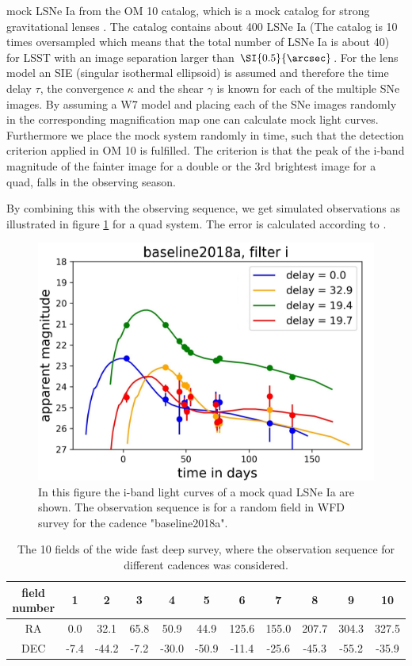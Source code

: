 mock LSNe Ia from the OM 10 catalog, which is a mock catalog for
strong gravitational lenses \citep{Oguri:2010}. The catalog contains
about 400 LSNe Ia (The catalog is 10 times oversampled which means
that the total number of LSNe Ia is about 40) for LSST with an image
separation larger than $\SI{0.5}{\arcsec}$. For the lens model an SIE
(singular isothermal ellipsoid) \citep{Kormann:1994} is assumed and
therefore the time delay $\tau$, the convergence $\kappa$ and the
shear $\gamma$ is known for each of the multiple SNe images. By
assuming a W7 model and placing each of the SNe images randomly in the
corresponding magnification map one can calculate mock light
curves. Furthermore we place the mock system randomly in time, such
that the detection criterion applied in OM 10 is fulfilled. The
criterion is that the peak of the i-band magnitude of the fainter image
for a double or the 3rd brightest image for a quad, falls in the
observing season.


By combining this with the observing sequence, we get simulated
observations as illustrated in figure \ref{fig: simulated observation}
for a quad system. The error is calculated according to \cite[sec 3.5,
p. 67]{2009:LSSTscience}.
\begin{figure}[h!]
\centering
\includegraphics[scale=0.7]{figures/Obsevation_number399_baseline2018a_filter_i_oversampling_00.jpg}
\caption[]{In this figure the i-band light curves of a mock quad LSNe Ia are shown. The observation sequence is for a random field in WFD survey for the cadence "baseline2018a".}
\label{fig: simulated observation}
\end{figure}
%
\begin{table}
\centering
\begin{tabular}{c|c|c|c|c|c|c|c|c|c|c}
field number & 1 & 2 & 3 & 4 & 5& 6 & 7 & 8 & 9 & 10  \\
\hline
RA& 0.0 & 32.1 & 65.8 & 50.9 &44.9& 125.6 & 155.0 & 207.7 & 304.3 & 327.5  \\
\hline
DEC& -7.4 & -44.2 & -7.2 & -30.0 & -50.9& -11.4 & -25.6 & -45.3 & -55.2 & -35.9  \\
\end{tabular}
\caption{The 10 fields of the wide fast deep survey, where the observation sequence for different cadences was considered.}
\label{tab: 10 wfd fields}
\end{table}
%
\FloatBarrier

